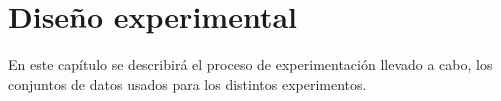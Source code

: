 \chapter{Diseño experimental}\label{ch:diseno-experimental}
En este capítulo se describirá el proceso de experimentación llevado a cabo, los conjuntos de datos usados para los
distintos experimentos.\\[6pt]
